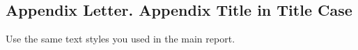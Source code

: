 \begin{FlushLeft}
    \part{Appendix Letter. Appendix Title in Title Case}
\end{FlushLeft}
Use the same text styles you used in the main report.